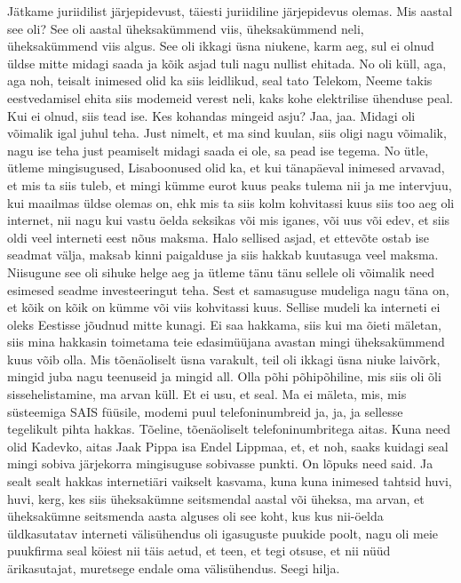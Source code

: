 Jätkame juriidilist järjepidevust, täiesti juriidiline järjepidevus olemas.
Mis aastal see oli? See oli aastal üheksakümmend viis, üheksakümmend neli, üheksakümmend viis algus.
See oli ikkagi üsna niukene, karm aeg, sul ei olnud üldse mitte midagi saada ja kõik asjad tuli nagu nullist ehitada.
No oli küll, aga, aga noh, teisalt inimesed olid ka siis leidlikud, seal tato Telekom, Neeme takis eestvedamisel ehita siis modemeid verest neli, kaks kohe elektrilise ühenduse peal. Kui ei olnud, siis tead ise.
Kes kohandas mingeid asju? Jaa, jaa. Midagi oli võimalik igal juhul teha.
Just nimelt, et ma sind kuulan, siis oligi nagu võimalik, nagu ise teha just peamiselt midagi saada ei ole, sa pead ise tegema.
No ütle, ütleme mingisugused,
Lisaboonused olid ka, et kui tänapäeval inimesed arvavad, et mis ta siis tuleb, et mingi kümme eurot kuus peaks tulema nii ja me intervjuu, kui maailmas üldse olemas on, ehk mis ta siis kolm kohvitassi kuus siis too aeg oli internet, nii nagu kui vastu öelda seksikas või mis iganes, või uus või edev, et siis oldi veel interneti eest nõus maksma. Halo sellised asjad, et ettevõte ostab ise seadmat välja, maksab kinni paigalduse ja siis hakkab kuutasuga veel maksma. Niisugune see oli sihuke helge aeg ja ütleme tänu tänu sellele oli võimalik need esimesed seadme investeeringut teha. Sest et samasuguse mudeliga nagu täna on, et kõik on kõik on kümme või viis kohvitassi kuus. Sellise mudeli ka interneti ei oleks Eestisse jõudnud mitte kunagi.
Ei saa hakkama, siis kui ma õieti mäletan, siis mina hakkasin toimetama teie edasimüüjana avastan mingi üheksakümmend kuus võib olla. Mis tõenäoliselt üsna varakult, teil oli ikkagi üsna niuke laivõrk, mingid juba nagu teenuseid ja mingid all.
Olla põhi põhipõhiline, mis siis oli õli sissehelistamine, ma arvan küll. Et ei usu, et seal. Ma ei mäleta, mis, mis süsteemiga SAIS füüsile, modemi puul telefoninumbreid ja, ja, ja sellesse tegelikult pihta hakkas. Tõeline, tõenäoliselt telefoninumbritega aitas. Kuna need olid Kadevko, aitas Jaak Pippa isa Endel Lippmaa, et, et noh, saaks kuidagi seal mingi sobiva järjekorra mingisuguse sobivasse punkti. On lõpuks need said.
Ja sealt sealt hakkas internetiäri vaikselt kasvama, kuna kuna inimesed tahtsid huvi, huvi, kerg, kes siis üheksakümne seitsmendal aastal või üheksa, ma arvan, et üheksakümne seitsmenda aasta alguses oli see koht, kus kus nii-öelda üldkasutatav interneti välisühendus oli igasuguste puukide poolt, nagu oli meie puukfirma seal köiest nii täis aetud, et teen, et tegi otsuse, et nii nüüd ärikasutajat, muretsege endale oma välisühendus.
Seegi hilja.
